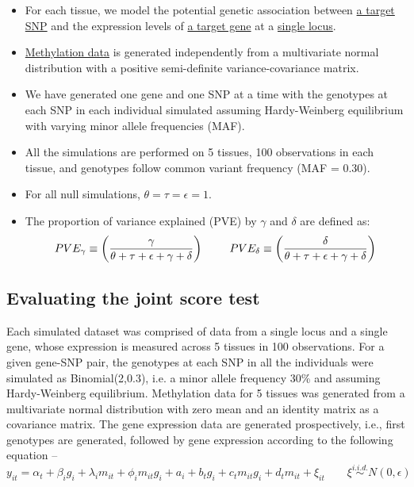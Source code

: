 \documentclass[hidelinks]{article}
\begin{document}
\begin{itemize}
\item For each tissue, we model the potential genetic association between \underline{a target SNP} and the expression levels of \underline{a target gene} at a \underline{single locus}. 
\item \underline{Methylation data} is generated independently from a multivariate normal distribution with a positive semi-definite variance-covariance matrix.
\item We have generated one gene and one SNP at a time with the genotypes at each SNP in each individual simulated assuming Hardy-Weinberg equilibrium with varying minor allele frequencies (MAF). 
\item All the simulations are performed on 5 tissues, 100 observations in each tissue, and genotypes follow common variant frequency (MAF = 0.30).
\item For all null simulations, $\theta = \tau = \epsilon = 1$. 
\item The proportion of variance explained (PVE) by $\gamma$ and $\delta$ are defined as:
\[
\large
PVE_{\gamma} \equiv \left(\frac{\gamma}{\theta + \tau + \epsilon + \gamma + \delta }\right)  \qquad PVE_{\delta} \equiv \left(\frac{\delta}{\theta + \tau + \epsilon + \gamma + \delta}\right) 
\]
\end{itemize}

\subsection{Evaluating the joint score test}

Each simulated dataset was comprised of data from a single locus and a single gene, whose expression is measured across 5 tissues in 100 observations. For a given gene-SNP pair, the genotypes at each SNP in all the individuals were simulated as Binomial(2,0.3), i.e. a minor allele frequency 30\% and assuming Hardy-Weinberg equilibrium. Methylation data for 5 tissues was generated from a multivariate normal distribution with zero mean and an identity matrix as a covariance matrix. The gene expression data are generated prospectively, i.e., first genotypes are generated, followed by gene expression according to the following equation --
\begingroup
\large
\begin{equation}
y_{it} = \alpha_t + \beta_i g_i + \lambda_i m_{it} + \phi_i m_{it} g_i + a_i + b_t g_i + c_t m_{it} g_i + d_t m_{it} + \xi_{it} \qquad \xi  \overset{i.i.d.} \sim N \left( 0, \epsilon \right)
\end{equation}
\endgroup
\end{document}
